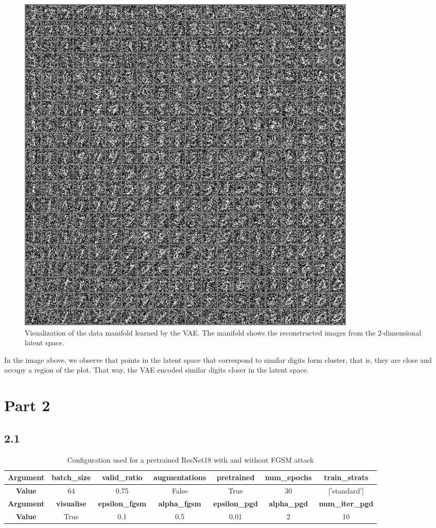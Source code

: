 \documentclass{article}
\begin{document}

\begin{figure}[H]
    \centering
    \includegraphics[width=0.8\textwidth]{images/vae_manifold.png}
    \caption{Visualization of the data manifold learned by the VAE. The manifold shows the reconstructed images from the
    2-dimensional latent space.}
    \label{fig:vae_manifold}
\end{figure}

In the image above, we observe that points in the latent space that correspond to similar digits form cluster, that is,
they are close and occupy a region of the plot. That way, the VAE encoded similar digits closer in the latent space.


\newpage
\section*{Part 2}

\subsection*{2.1}

\begin{table}[h!]
    \centering
    \begin{tabular}{|c|c|c|c|c|c|c|}
    \hline
    \textbf{Argument} & \textbf{batch\_size} & \textbf{valid\_ratio} & \textbf{augmentations} & \textbf{pretrained} & \textbf{num\_epochs} & \textbf{train\_strats} \\
    \hline
    \textbf{Value} & 64 & 0.75 & False & True & 30 & ['standard'] \\
    \hline
    \textbf{Argument} & \textbf{visualise} & \textbf{epsilon\_fgsm} & \textbf{alpha\_fgsm} & \textbf{epsilon\_pgd} & \textbf{alpha\_pgd} & \textbf{num\_iter\_pgd} \\
    \hline
    \textbf{Value} & True & 0.1 & 0.5 & 0.01 & 2 & 10 \\
    \hline
    \end{tabular}
    \caption{Configuration used for a pretrained ResNet18 with and without FGSM attack}
\end{table}
\end{document}
